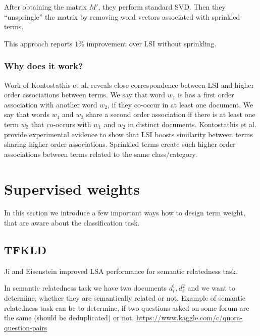     After obtaining the matrix $M'$, they perform standard SVD. 
    Then they ``unspringle'' the matrix by removing word vectors associated with sprinkled terms.
    
    This approach reports $1\%$ improvement over LSI without sprinkling.
    
    \subsubsection{Why does it work?}
    Work of Kontostathis et al. \cite{kontostathis2006framework} reveals close correspondence between LSI and higher order associations between terms. 
    We say that word $w_1$ is has a first order association with another word $w_2$, if they co-occur in at least one document. 
    We say that words $w_1$ and $w_2$ share a second order association if there is at least one term $w_3$ that co-occurs with $w_1$ and $w_2$ in distinct documents. 
    Kontostathis et al. provide experimental evidence to show that LSI boosts similarity between terms sharing higher order associations. 
    Sprinkled terms create such higher order associations between terms related to  the same class/category.
        
\section{Supervised weights} \label{sec:supervised:weights}
    
    In this section we introduce a few important ways how to design term weight, that are aware about the classification task.
    
    \* %
    
    \subsection{TFKLD}
        Ji and Eisenstein \cite{ji2013discriminative} %
        improved LSA performance for semantic relatedness task.
        
        In semantic relatedness task we have two documents $d_i^1, d_i^2$ and we want to determine, whether they are semantically related or not. 
        Example of semantic relatedness task can be to determine, if two questions asked on some forum are the same (should be deduplicated) or not.
        \url{https://www.kaggle.com/c/quora-question-pairs}
        
